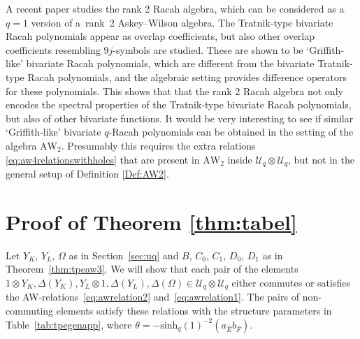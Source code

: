 \documentclass[pdftex]{sigma}
\numberwithin{equation}{section}
\newcommand{\AW}[1]{\mathrm{AW}_{#1}}
\newcommand{\dyone}{\Delta\left(Y_{L}\right)}
\newcommand{\dyzero}{\Delta\left(Y_{K}\right)}
\newcommand{\shq}{\mathrm{sinh}_q}
\newcommand{\Uq}{\mathcal{U}_q}
\newcommand{\yone}{Y_{L}\otimes 1}
\newcommand{\yzero}{1\otimes Y_{K}}
\begin{document}
\begin{Remark}
	A recent paper \cite{CFR} studies the rank 2 Racah algebra, which can be considered as a~$q=1$ version of a~rank~2 Askey--Wilson algebra. The Tratnik-type bivariate Racah polynomials appear as overlap coefficients, but also other overlap coefficients resembling $9j$-symbols are studied. These are shown to be `Griffith-like' bivariate Racah polynomials, which are different from the bivariate Tratnik-type Racah polynomials, and the algebraic setting provides difference operators for these polynomials. This shows that that the rank 2 Racah algebra not only encodes the spectral properties of the Tratnik-type bivariate Racah polynomials, but also of other bivariate functions. It would be very interesting to see if similar `Griffith-like' bivariate $q$-Racah polynomials can be obtained in the setting of the algebra $\AW{2}$. Presumably this requires the extra relations \eqref{eq:aw4relationswithholes} that are present in $\AW{2}$ inside $\Uq\otimes\Uq$, but not in the general setup of Definition \ref{Def:AW2}.
\end{Remark}

\appendix

\section{Proof of Theorem \ref{thm:tabel}}\label{app:uquqbivaraw}
Let $Y_K$, $Y_L$, $\Omega$ as in Section~\ref{sec:uq} and $B$, $C_0$, $C_1$, $D_0$, $D_1$ as in Theorem~\ref{thm:tpeaw3}. We will show that each pair of the elements $\yzero, \dyzero, \yone, \dyone, \Delta(\Omega)\in\Uq\otimes\Uq$ either commutes or satisfies the AW-relations~\eqref{eq:awrelation2} and~\eqref{eq:awrelation1}. The pairs of non-commuting elements satisfy these relations with the structure parameters in
Table~\ref{tab:tpegenapp}, where $\theta=-\shq(1)^{-2}(a_{\hat{E}}b_{\hat{F}})$.
\end{document}

